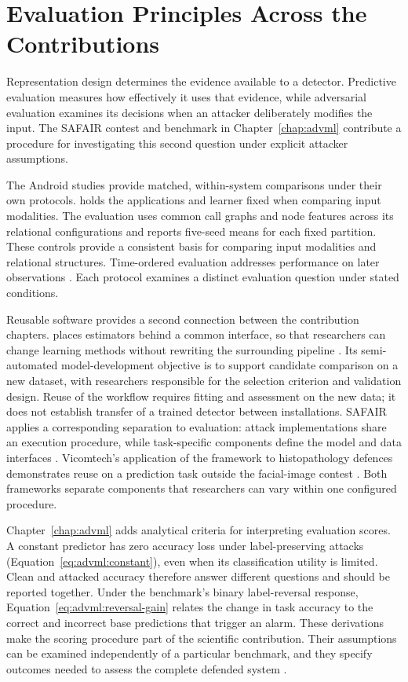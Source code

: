\section{Evaluation Principles Across the Contributions}
\label{sec:discussion:evaluation}
\label{sec:discussion:4}
\label{sec:discussion:6}

Representation design determines the evidence available to a detector. Predictive evaluation
measures how effectively it uses that evidence, while adversarial evaluation examines its
decisions when an attacker deliberately modifies the input. The SAFAIR contest and benchmark
in Chapter~\ref{chap:advml} contribute a procedure for investigating this second question
under explicit attacker assumptions.

The Android studies provide matched, within-system comparisons under their own protocols.
\hybroid{} holds the applications and learner fixed when comparing input modalities. The
\hgann{} evaluation uses common call graphs and node features across its relational
configurations and reports five-seed means for each fixed partition. These controls provide a
consistent basis for comparing input modalities and relational structures.
Time-ordered evaluation addresses performance on later observations
\cite{pendlebury2019tesseract}. Each protocol examines a distinct evaluation
question under stated conditions.

Reusable software provides a second connection between the contribution chapters.
\nadics{} places estimators behind a common interface, so that researchers can change
learning methods without rewriting the surrounding pipeline \cite{iuno_ap4}. Its
semi-automated model-development objective is to support candidate comparison on a new dataset,
with researchers responsible for the selection criterion and validation design. Reuse of the
workflow requires fitting and assessment on the new data; it does not establish transfer of a
trained detector between installations.
SAFAIR applies a corresponding separation to evaluation: attack implementations share an
execution procedure, while task-specific components define the model and data interfaces
\cite{sparta2022d76}. Vicomtech's application of the framework to histopathology defences
demonstrates reuse on a prediction task outside the facial-image contest
\cite[Section~3.1.3.1]{sparta2022d76}. Both frameworks separate components that researchers
can vary within one configured procedure.

Chapter~\ref{chap:advml} adds analytical criteria for interpreting evaluation scores. A
constant predictor has zero accuracy loss under label-preserving attacks
(Equation~\ref{eq:advml:constant}), even when its classification utility is limited.
Clean and attacked accuracy therefore answer different questions and should be reported
together. Under the benchmark's binary label-reversal response,
Equation~\ref{eq:advml:reversal-gain} relates the change in task accuracy to the correct and
incorrect base predictions that trigger an alarm. These derivations make the scoring
procedure part of the scientific contribution. Their assumptions can be examined independently of a particular benchmark,
and they specify outcomes needed to assess the complete defended system
\cite{carlini2019evaluating}.

